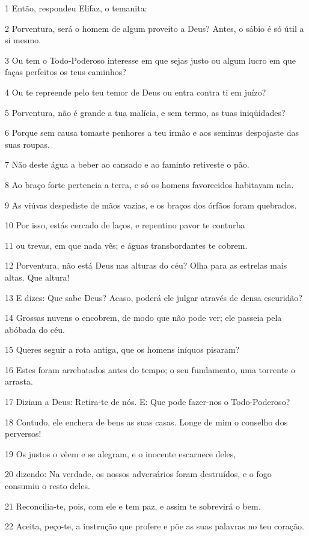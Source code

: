 \par 1 Então, respondeu Elifaz, o temanita:
\par 2 Porventura, será o homem de algum proveito a Deus? Antes, o sábio é só útil a si mesmo.
\par 3 Ou tem o Todo-Poderoso interesse em que sejas justo ou algum lucro em que faças perfeitos os teus caminhos?
\par 4 Ou te repreende pelo teu temor de Deus ou entra contra ti em juízo?
\par 5 Porventura, não é grande a tua malícia, e sem termo, as tuas iniqüidades?
\par 6 Porque sem causa tomaste penhores a teu irmão e aos seminus despojaste das suas roupas.
\par 7 Não deste água a beber ao cansado e ao faminto retiveste o pão.
\par 8 Ao braço forte pertencia a terra, e só os homens favorecidos habitavam nela.
\par 9 As viúvas despediste de mãos vazias, e os braços dos órfãos foram quebrados.
\par 10 Por isso, estás cercado de laços, e repentino pavor te conturba
\par 11 ou trevas, em que nada vês; e águas transbordantes te cobrem.
\par 12 Porventura, não está Deus nas alturas do céu? Olha para as estrelas mais altas. Que altura!
\par 13 E dizes: Que sabe Deus? Acaso, poderá ele julgar através de densa escuridão?
\par 14 Grossas nuvens o encobrem, de modo que não pode ver; ele passeia pela abóbada do céu.
\par 15 Queres seguir a rota antiga, que os homens iníquos pisaram?
\par 16 Estes foram arrebatados antes do tempo; o seu fundamento, uma torrente o arrasta.
\par 17 Diziam a Deus: Retira-te de nós. E: Que pode fazer-nos o Todo-Poderoso?
\par 18 Contudo, ele enchera de bens as suas casas. Longe de mim o conselho dos perversos!
\par 19 Os justos o vêem e se alegram, e o inocente escarnece deles,
\par 20 dizendo: Na verdade, os nossos adversários foram destruídos, e o fogo consumiu o resto deles.
\par 21 Reconcilia-te, pois, com ele e tem paz, e assim te sobrevirá o bem.
\par 22 Aceita, peço-te, a instrução que profere e põe as suas palavras no teu coração.
